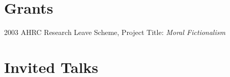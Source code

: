\documentclass[contbibnum]{cv}
\begin{document}

\section{Grants}\label{sec:grants} %

\begin{topic}
	\item[2003] AHRC Research Leave Scheme, Project Title: \emph{Moral Fictionalism}
\end{topic}


\section{Invited Talks}\label{sec:presentations} %
\end{document}
